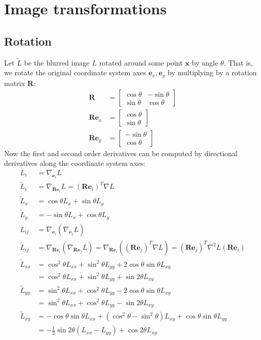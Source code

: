 \documentclass[thesis.tex]{subfiles}
\begin{document}
\appendix
\chapter{Image transformations} \label{apx:image_transformations}
\section{Rotation} \label{apx:rotation}

Let $\widetilde{L}$ be the blurred image $L$ rotated around some point $\mathbf{x}$ by angle $\theta$. That is, we rotate the original coordinate system axes $\mathbf{e}_x, \mathbf{e}_y$ by multiplying by a rotation matrix $\mathbf{R}$:
%
\begin{align}
\mathbf{R} &= \begin{bmatrix}
\cos \theta & -\sin \theta \\
\sin \theta & \cos \theta
\end{bmatrix} \\
\mathbf{Re}_x &= \begin{bmatrix}
\cos \theta \\ \sin \theta
\end{bmatrix} \\
\mathbf{Re}_y &= \begin{bmatrix}
-\sin \theta \\ \cos \theta
\end{bmatrix}
\end{align}
%
Now the first and second order derivatives can be computed by directional derivatives along the coordinate system axes:
%
\begin{align}
L_i &= \nabla_{\mathbf{e}_i} L \\
\widetilde{L}_i &= \nabla_{\mathbf{Re}_i} L = (\mathbf{Re}_i)^T \nabla L \\
\widetilde{L}_x &= \cos \theta L_x + \sin \theta L_y \\
\widetilde{L}_y &= -\sin \theta L_x + \cos \theta L_y \\
L_{ij} &= \nabla_{\mathbf{e}_i} (\nabla_{\mathbf{e}_j} L) \\
\widetilde{L}_{ij} &= \nabla_{\mathbf{Re}_i} (\nabla_{\mathbf{Re}_j} L)
= \nabla_{\mathbf{Re}_i} \left( (\mathbf{Re}_j)^T \nabla L \right)
= (\mathbf{Re}_j)^T \nabla^2 L (\mathbf{Re}_i) \\
\widetilde{L}_{xx} &= \cos^2 \theta L_{xx} + \sin^2 \theta L_{yy} + 2 \cos \theta \sin \theta L_{xy} \\
&= \cos^2 \theta L_{xx} + \sin^2 \theta L_{yy} + \sin 2\theta L_{xy} \\
\widetilde{L}_{yy} &= \sin^2 \theta L_{xx} + \cos^2 \theta L_{yy} - 2 \cos \theta \sin \theta L_{xy} \\
&= \sin^2 \theta L_{xx} + \cos^2 \theta L_{yy} - \sin 2\theta L_{xy} \\
\widetilde{L}_{xy} &= -\cos \theta \sin \theta L_{xx} + (\cos^2 \theta - \sin^2 \theta) L_{xy} + \cos \theta \sin \theta L_{yy} \\
&= -\frac12 \sin 2\theta (L_{xx} - L_{yy}) + \cos 2\theta L_{xy}
\end{align}
%
\end{document}
